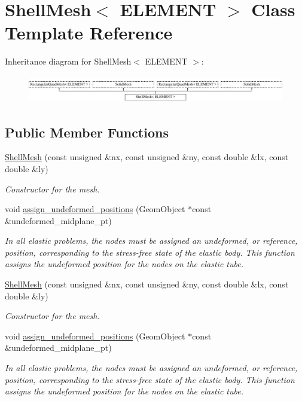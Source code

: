 \hypertarget{classShellMesh}{}\section{Shell\+Mesh$<$ E\+L\+E\+M\+E\+NT $>$ Class Template Reference}
\label{classShellMesh}
Inheritance diagram for Shell\+Mesh$<$ E\+L\+E\+M\+E\+NT $>$\+:\begin{figure}[H]
\begin{center}
\leavevmode
\includegraphics[height=1.206897cm]{classShellMesh}
\end{center}
\end{figure}
\subsection*{Public Member Functions}
\begin{DoxyCompactItemize}
\item 
\hyperlink{classShellMesh_a6ce8404f69fa3f4c10dac5c18cff0699}{Shell\+Mesh} (const unsigned \&nx, const unsigned \&ny, const double \&lx, const double \&ly)
\begin{DoxyCompactList}\small\item\em Constructor for the mesh. \end{DoxyCompactList}\item 
void \hyperlink{classShellMesh_a3576870121fad30d0f99588ea8082ca1}{assign\+\_\+undeformed\+\_\+positions} (Geom\+Object $\ast$const \&undeformed\+\_\+midplane\+\_\+pt)
\begin{DoxyCompactList}\small\item\em In all elastic problems, the nodes must be assigned an undeformed, or reference, position, corresponding to the stress-\/free state of the elastic body. This function assigns the undeformed position for the nodes on the elastic tube. \end{DoxyCompactList}\item 
\hyperlink{classShellMesh_a6ce8404f69fa3f4c10dac5c18cff0699}{Shell\+Mesh} (const unsigned \&nx, const unsigned \&ny, const double \&lx, const double \&ly)
\begin{DoxyCompactList}\small\item\em Constructor for the mesh. \end{DoxyCompactList}\item 
void \hyperlink{classShellMesh_a3576870121fad30d0f99588ea8082ca1}{assign\+\_\+undeformed\+\_\+positions} (Geom\+Object $\ast$const \&undeformed\+\_\+midplane\+\_\+pt)
\begin{DoxyCompactList}\small\item\em In all elastic problems, the nodes must be assigned an undeformed, or reference, position, corresponding to the stress-\/free state of the elastic body. This function assigns the undeformed position for the nodes on the elastic tube. \end{DoxyCompactList}\end{DoxyCompactItemize}


